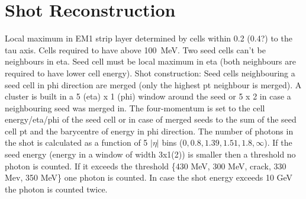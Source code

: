 \section{Shot Reconstruction}
\label{sec:shot_reco}
Local maximum in EM1 strip layer determined by cells within 0.2 (0.4?) to the
tau axis. Cells required to have above \SI{100}{\mega\electronvolt}. Two seed
cells can't be neighbours in eta. Seed cell must be local maximum in eta (both
neighbours are required to have lower cell energy). Shot construction: Seed
cells neighbouring a seed cell in phi direction are merged (only the highest pt
neighbour is merged). A cluster is built in a 5 (eta) x 1 (phi) window around
the seed or 5 x 2 in case a neighbouring seed was merged in. The four-momentum
is set to the cell energy/eta/phi of the seed cell or in case of merged seeds to
the sum of the seed cell pt and the barycentre of energy in phi direction. The
number of photons in the shot is calculated as a function of 5 $|\eta|$ bins
($0, 0.8, 1.39, 1.51, 1.8, \infty$). If the seed energy (energy in a window of
width 3x1(2)) is smaller then a threshold no photon is counted. If it exceeds
the threshold \{430 MeV, 300 MeV, crack, 330 Mev, 350 MeV\} one photon is
counted. In case the shot energy exceeds 10 GeV the photon is counted twice.


\cite{atlas:taurec:run1}
\cite{atlas:taurec:run2}
\cite{atlas:taurec:decaymodes}

